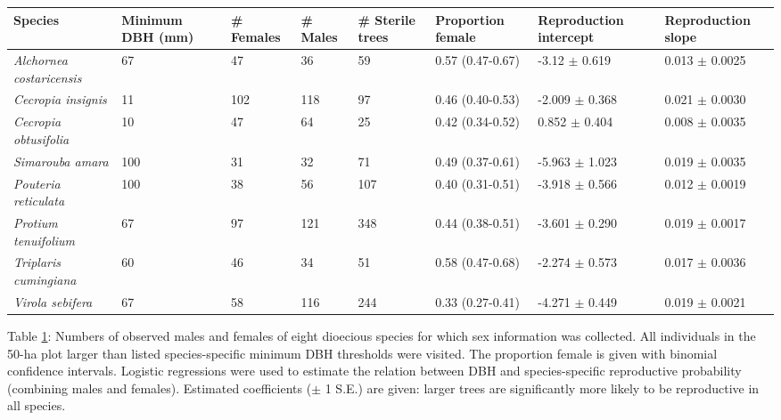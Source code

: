 \documentclass[b5paper,justified]{tufte-book} %
\begin{document}
\begin{fullwidth}
\begin{landscape}
\begin{table}
\begin{center}
\footnotesize
\vspace*{4cm}
\hspace*{4.5cm}
\begin{tabular}{l l l l l l l l}
\hline 
Species & Minimum DBH (mm)	& \# Females	& \# Males &	\# Sterile trees	 & Proportion female &	Reproduction intercept	& Reproduction slope  \\ 
\hline 
\emph{Alchornea costaricensis} &	67	& 47 & 36 &	59 & 0.57 (0.47-0.67) & -3.12 $\pm$ 0.619 & 0.013 $\pm$ 0.0025 \\
\emph{Cecropia insignis} & 	11 &	102	& 118 & 97 & 0.46 (0.40-0.53) & -2.009 $\pm$ 0.368	& 0.021 $\pm$ 0.0030 \\
\emph{Cecropia obtusifolia} &	10 & 47 & 64 & 25	& 0.42 (0.34-0.52) & 0.852 $\pm$ 0.404 & 0.008 $\pm$ 0.0035 \\
\emph{Simarouba amara}	 & 100	& 31 & 32 & 71 & 0.49 (0.37-0.61) & -5.963 $\pm$ 1.023	& 0.019 $\pm$ 0.0035 \\
\emph{Pouteria reticulata} &	100	& 38 &	56	& 107 &	0.40 (0.31-0.51) &	-3.918 $\pm$ 0.566 &	0.012 $\pm$ 0.0019 \\
\emph{Protium tenuifolium} &	67  &	97 &	121 &	348 &	0.44 (0.38-0.51) &	-3.601 $\pm$ 0.290 &	0.019 $\pm$ 0.0017 \\
\emph{Triplaris cumingiana} &	60	& 46 &	34  &	51  &	0.58 (0.47-0.68) &	-2.274 $\pm$ 0.573 &	0.017 $\pm$ 0.0036 \\
\emph{Virola sebifera}	& 67 &	58 &	116 & 244 & 0.33 (0.27-0.41) & -4.271 $\pm$ 0.449	& 0.019 $\pm$ 0.0021 \\
\hline 
\end{tabular} 
\label{tab:chap6tab2}
\hspace*{4.6cm}\begin{minipage}{20cm} 
\vspace{0.1cm}
Table \ref{tab:chap6tab2}: Numbers of observed males and females of eight dioecious species for which sex information was collected. All individuals in the 50-ha plot larger than listed species-specific minimum DBH thresholds were visited. The proportion female is given with binomial confidence intervals. Logistic regressions were used to estimate the relation between DBH and species-specific reproductive probability (combining males and females). Estimated coefficients ($\pm$ 1 S.E.) are given: larger trees are significantly more likely to be reproductive in all species.
 \end{minipage} 
\end{center}
\end{table}
\end{landscape}



\end{fullwidth}
\end{document}
